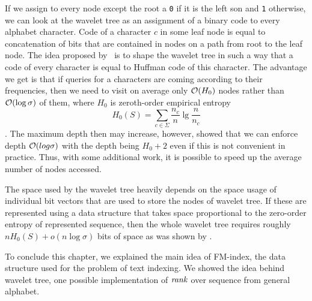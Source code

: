 If we assign to every node except the root a {\tt 0} if it is the left son and {\tt 1}
otherwise, we can look at the wavelet tree as an assignment of a binary code to every
alphabet character. Code of a character $c$ in some leaf node is equal to concatenation of
bits that are contained in nodes on a path from root to the leaf node. The idea proposed
by~\cite{makinen2005succinct} is to shape the wavelet tree in such a way that a code of every
character is equal to Huffman code of this character. The advantage we get is that if queries
for a characters are coming according to their frequencies, then we need to visit on average
only $\mathcal{O}(H_0)$ nodes rather than $\mathcal{O}(\log \sigma)$ of them, where $H_0$ is zeroth-order empirical
entropy $$H_0(S)=\sum_{c\in\Sigma} \frac{n_c}{n} \lg \frac{n}{n_c}$$. The maximum depth then
may increase, however, \cite{grabowski2004first} showed that we can enforce depth
$\mathcal{O}(log \sigma)$ with the depth being $H_0+2$ even if this is not convenient in practice.
Thus, with some additional work, it is possible to speed up the average number of nodes accessed.

The space used by the wavelet tree heavily depends on the space usage of individual bit vectors
that are used to store the nodes of wavelet tree. If these are represented using a data structure
that takes space proportional to the zero-order entropy of represented sequence, then the whole
wavelet tree requires roughly $nH_0(S) + o(n\log\sigma)$ bits of space as was shown by
\cite{grossi2003high}.

To conclude this chapter, we explained the main idea of FM-index, the data structure used for the
problem of text indexing. We showed the idea behind wavelet tree, one possible implementation of
$\mathit{rank}$ over sequence from general alphabet.

